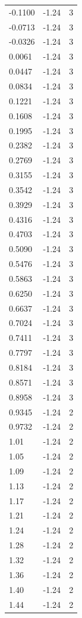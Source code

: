 \begin{longtable}{lrr}
  -0.1100 & -1.24 & 3 \\
  -0.0713 & -1.24 & 3 \\
  -0.0326 & -1.24 & 3 \\
  0.0061 & -1.24 & 3 \\
  0.0447 & -1.24 & 3 \\
  0.0834 & -1.24 & 3 \\
  0.1221 & -1.24 & 3 \\
  0.1608 & -1.24 & 3 \\
  0.1995 & -1.24 & 3 \\
  0.2382 & -1.24 & 3 \\
  0.2769 & -1.24 & 3 \\
  0.3155 & -1.24 & 3 \\
  0.3542 & -1.24 & 3 \\
  0.3929 & -1.24 & 3 \\
  0.4316 & -1.24 & 3 \\
  0.4703 & -1.24 & 3 \\
  0.5090 & -1.24 & 3 \\
  0.5476 & -1.24 & 3 \\
  0.5863 & -1.24 & 3 \\
  0.6250 & -1.24 & 3 \\
  0.6637 & -1.24 & 3 \\
  0.7024 & -1.24 & 3 \\
  0.7411 & -1.24 & 3 \\
  0.7797 & -1.24 & 3 \\
  0.8184 & -1.24 & 3 \\
  0.8571 & -1.24 & 3 \\
  0.8958 & -1.24 & 3 \\
  0.9345 & -1.24 & 2 \\
  0.9732 & -1.24 & 2 \\
  1.01 & -1.24 & 2 \\
  1.05 & -1.24 & 2 \\
  1.09 & -1.24 & 2 \\
  1.13 & -1.24 & 2 \\
  1.17 & -1.24 & 2 \\
  1.21 & -1.24 & 2 \\
  1.24 & -1.24 & 2 \\
  1.28 & -1.24 & 2 \\
  1.32 & -1.24 & 2 \\
  1.36 & -1.24 & 2 \\
  1.40 & -1.24 & 2 \\
  1.44 & -1.24 & 2 \\

\end{longtable}
